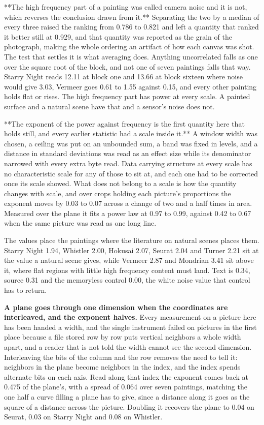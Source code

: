 **The high frequency part of a painting was called camera noise and it is not, which reverses the conclusion drawn from it.** Separating the two by a median of every three raised the ranking from 0.786 to 0.821 and left a quantity that ranked it better still at 0.929, and that quantity was reported as the grain of the photograph, making the whole ordering an artifact of how each canvas was shot. The test that settles it is what averaging does. Anything uncorrelated falls as one over the square root of the block, and not one of seven paintings falls that way. Starry Night reads 12.11 at block one and 13.66 at block sixteen where noise would give 3.03, Vermeer goes 0.61 to 1.55 against 0.15, and every other painting holds flat or rises. The high frequency part has power at every scale. A painted surface and a natural scene have that and a sensor's noise does not.

**The exponent of the power against frequency is the first quantity here that holds still, and every earlier statistic had a scale inside it.** A window width was chosen, a ceiling was put on an unbounded sum, a band was fixed in levels, and a distance in standard deviations was read as an effect size while its denominator narrowed with every extra byte read. Data carrying structure at every scale has no characteristic scale for any of those to sit at, and each one had to be corrected once its scale showed. What does not belong to a scale is how the quantity changes with scale, and over crops holding each picture's proportions the exponent moves by 0.03 to 0.07 across a change of two and a half times in area. Measured over the plane it fits a power law at 0.97 to 0.99, against 0.42 to 0.67 when the same picture was read as one long line.

The values place the paintings where the literature on natural scenes places them. Starry Night 1.94, Whistler 2.00, Hokusai 2.07, Seurat 2.04 and Turner 2.21 sit at the value a natural scene gives, while Vermeer 2.87 and Mondrian 3.41 sit above it, where flat regions with little high frequency content must land. Text is 0.34, source 0.31 and the memoryless control 0.00, the white noise value that control has to return.

\textbf{A plane goes through one dimension when the coordinates are interleaved, and the exponent halves.} Every measurement on a picture here has been handed a width, and the single instrument failed on pictures in the first place because a file stored row by row puts vertical neighbors a whole width apart, and a reader that is not told the width cannot see the second dimension. Interleaving the bits of the column and the row removes the need to tell it: neighbors in the plane become neighbors in the index, and the index spends alternate bits on each axis. Read along that index the exponent comes back at 0.475 of the plane's, with a spread of 0.064 over seven paintings, matching the one half a curve filling a plane has to give, since a distance along it goes as the square of a distance across the picture. Doubling it recovers the plane to 0.04 on Seurat, 0.03 on Starry Night and 0.08 on Whistler.

